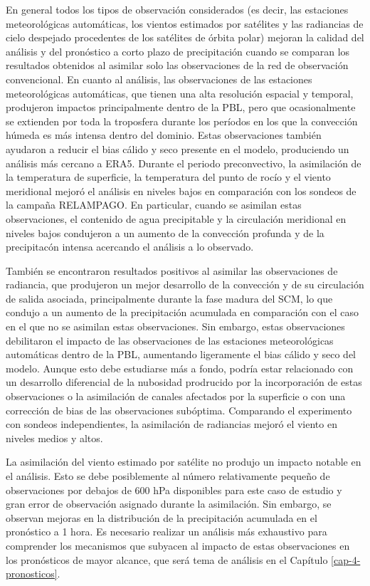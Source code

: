 \documentclass[12pt,oneside,a4paper]{reedthesis}
\begin{document}
En general todos los tipos de observación considerados (es decir, las estaciones meteorológicas automáticas, los vientos estimados por satélites y las radiancias de cielo despejado procedentes de los satélites de órbita polar) mejoran la calidad del análisis y del pronóstico a corto plazo de precipitación cuando se comparan los resultados obtenidos al asimilar solo las observaciones de la red de observación convencional. En cuanto al análisis, las observaciones de las estaciones meteorológicas automáticas, que tienen una alta resolución espacial y temporal, produjeron impactos principalmente dentro de la PBL, pero que ocasionalmente se extienden por toda la troposfera durante los períodos en los que la convección húmeda es más intensa dentro del dominio. Estas observaciones también ayudaron a reducir el bias cálido y seco presente en el modelo, produciendo un análisis más cercano a ERA5. Durante el periodo preconvectivo, la asimilación de la temperatura de superficie, la temperatura del punto de rocío y el viento meridional mejoró el análisis en niveles bajos en comparación con los sondeos de la campaña RELAMPAGO. En particular, cuando se asimilan estas observaciones, el contenido de agua precipitable y la circulación meridional en niveles bajos condujeron a un aumento de la convección profunda y de la precipitacón intensa acercando el análisis a lo observado.

También se encontraron resultados positivos al asimilar las observaciones de radiancia, que produjeron un mejor desarrollo de la convección y de su circulación de salida asociada, principalmente durante la fase madura del SCM, lo que condujo a un aumento de la precipitación acumulada en comparación con el caso en el que no se asimilan estas observaciones. Sin embargo, estas observaciones debilitaron el impacto de las observaciones de las estaciones meteorológicas automáticas dentro de la PBL, aumentando ligeramente el bias cálido y seco del modelo. Aunque esto debe estudiarse más a fondo, podría estar relacionado con un desarrollo diferencial de la nubosidad prodrucido por la incorporación de estas observaciones o la asimilación de canales afectados por la superficie o con una corrección de bias de las observaciones subóptima. Comparando el experimento con sondeos independientes, la asimilación de radiancias mejoró el viento en niveles medios y altos.

La asimilación del viento estimado por satélite no produjo un impacto notable en el análisis. Esto se debe posiblemente al número relativamente pequeño de observaciones por debajos de 600 hPa disponibles para este caso de estudio y gran error de observación asignado durante la asimilación. Sin embargo, se observan mejoras en la distribución de la precipitación acumulada en el pronóstico a 1 hora. Es necesario realizar un análisis más exhaustivo para comprender los mecanismos que subyacen al impacto de estas observaciones en los pronósticos de mayor alcance, que será tema de análisis en el Capítulo \ref{cap-4-pronosticos}.
\end{document}
